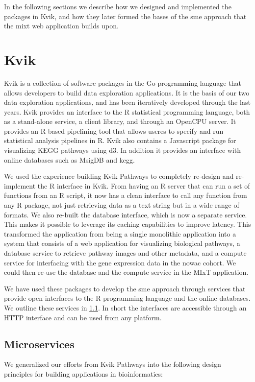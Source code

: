 In the following sections we describe how we designed and implemented the
packages in Kvik, and how they later formed the bases of the \gls{sme} approach
that the \gls{mixt} web application builds upon. 

\section{Kvik}\label{kviksec}
Kvik is a collection of software packages in the Go programming language that
allows developers to build data exploration applications. It is the basis of our
two data exploration applications, and has been iteratively developed through
the last years. Kvik provides an interface to the R statistical programming
language, both as a stand-alone service, a client library, and through an
OpenCPU server. It provides an R-based pipelining tool that allows useres to
specify and run statistical analysis pipelines in R.  Kvik also contains a
Javascript package for visualizing KEGG pathways using d3.\cite{d3}  In addition
it provides an interface with online databases such as MsigDB\cite{msigdb} and
\gls{kegg}\cite{kegg}. 

We used the experience building Kvik Pathways to completely re-design and
re-implement the R interface in Kvik. From having an R server that can run a
set of functions from an R script, it now has a clean interface to call any
function from any R package, not just retrieving data as a text string but in a
wide range of formats. We also re-built the database interface, which is now a
separate service. This makes it possible to leverage its caching capabilities
to improve latency. This transformed the application from being a single
monolithic application into a system that consists of a web application for
visualizing biological pathways, a database service to retrieve pathway images
and other metadata, and a compute service for interfacing with the gene
expression data in the \gls{nowac} cohort. We could then re-use the database and the
compute service in the MIxT application. 

We have used these packages to develop the \gls{sme} approach through services
that provide open interfaces to the R programming language and the online
databases.  We outline these services in \ref{micrservices}.  In short the
interfaces are accessible through an HTTP interface and can be used from any
platform.

\subsection{Microservices}\label{micrservices} 
We generalized our efforts from Kvik Pathways into the following design
principles for building applications in bioinformatics: 

